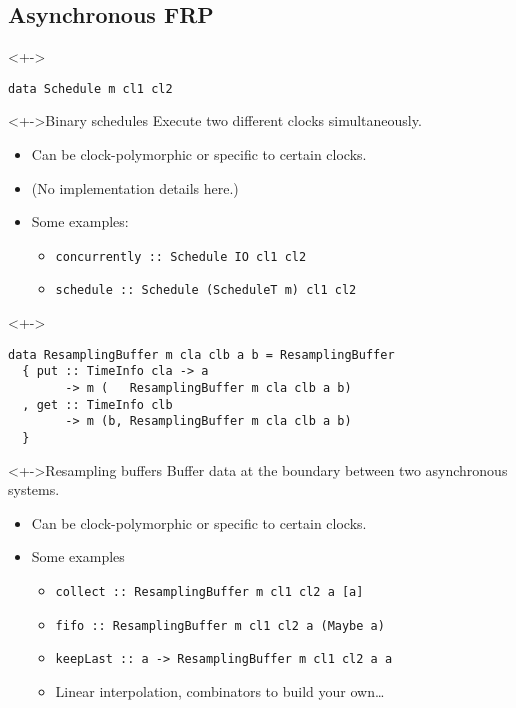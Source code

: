 \documentclass[handout]{enigtex-beamer-base}
\begin{document}
\subsection{Asynchronous FRP}

\begin{frame}[fragile]
\begin{block}<+->{}
\begin{verbatim}
data Schedule m cl1 cl2
\end{verbatim}
\end{block}
	\begin{block}<+->{Binary schedules}
		Execute two different clocks simultaneously.
	\end{block}
	\begin{itemize}[<+->]
		\item Can be clock-polymorphic or specific to certain clocks.
		\item (No implementation details here.)
		\item Some examples:
		\begin{itemize}[<+->]
			\item \texttt{concurrently :: Schedule IO cl1 cl2}
			\item \texttt{schedule :: Schedule (ScheduleT m) cl1 cl2}
		\end{itemize}
	\end{itemize}
\end{frame}


\begin{frame}[fragile]
\begin{block}<+->{}
\begin{verbatim}
data ResamplingBuffer m cla clb a b = ResamplingBuffer
  { put :: TimeInfo cla -> a
        -> m (   ResamplingBuffer m cla clb a b)
  , get :: TimeInfo clb
        -> m (b, ResamplingBuffer m cla clb a b)
  }
\end{verbatim}
\end{block}
\begin{block}<+->{Resampling buffers}
Buffer data at the boundary between two asynchronous systems.
\end{block}
	\begin{itemize}[<+->]
		\item Can be clock-polymorphic or specific to certain clocks.
		\item Some examples
		\begin{itemize}[<+->]
			\item \texttt{collect :: ResamplingBuffer m cl1 cl2 a [a]}
			\item \texttt{fifo :: ResamplingBuffer m cl1 cl2 a (Maybe a)}
			\item \texttt{keepLast :: a -> ResamplingBuffer m cl1 cl2 a a}
			\item Linear interpolation, combinators to build your own\dots
		\end{itemize}
	\end{itemize}
\end{frame}
\end{document}
